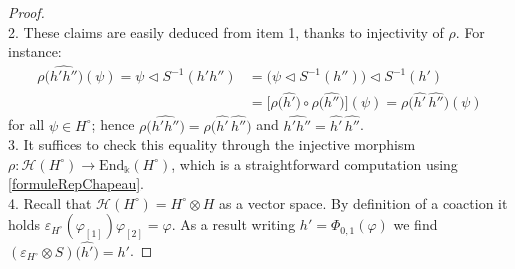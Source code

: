 \documentclass[10pt,a4paper]{amsart}
\begin{document}
\begin{proof}
\\2. These claims are easily deduced from item 1, thanks to injectivity of $\rho$. For instance:
\begin{align*}
\rho\bigl( \widehat{h'h''} \bigr)(\psi) = \psi \lhd S^{-1}(h'h'') &= \bigl( \psi \lhd S^{-1}(h'') \bigr) \lhd S^{-1}(h')\\
&= \bigl[ \rho\bigl(\widehat{h'}\bigr) \circ \rho\bigl( \widehat{h''} \bigr) \bigr](\psi) = \rho\bigl( \widehat{h'}\,\widehat{h''} \bigr)(\psi)
\end{align*}
for all $\psi \in H^\circ$; hence $\rho\bigl( \widehat{h'h''} \bigr) = \rho\bigl( \widehat{h'}\,\widehat{h''} \bigr)$ and $\widehat{h'h''} = \widehat{h'}\,\widehat{h''}$.
\\3. It suffices to check this equality through the injective morphism $\rho : \mathcal{H}(H^\circ) \to \mathrm{End}_\Bbbk(H^\circ)$, which is a straightforward computation using \eqref{formuleRepChapeau}.
\\4. Recall that $\mathcal{H}(H^\circ) = H^\circ \otimes H$ as a vector space. By definition of a coaction it holds $\varepsilon_{H^\circ}(\varphi_{[1]})\varphi_{[2]} = \varphi$. As a result writing $h' = \Phi_{0,1}(\varphi)$ we find $(\varepsilon_{H^\circ} \otimes S)\bigl(\widehat{h'} \bigr) = h'$.
\end{proof}
\end{document}
